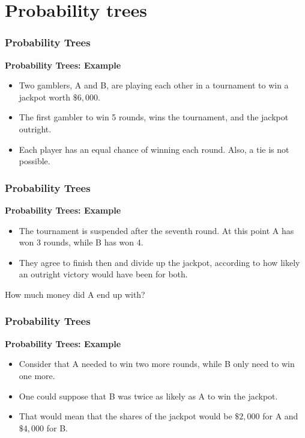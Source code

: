 \chapter{Probability trees}




\subsection{Probability Trees}
{

\textbf{Probability Trees: Example}
\begin{itemize}
\item Two gamblers, A and B, are playing each other in a tournament to win a jackpot worth $\$6,000$. 
\item The first gambler to win 5 rounds, wins the tournament, and the jackpot outright.
\item Each player has an equal chance of winning each round. Also, a tie is not possible.

\end{itemize}

}



\subsection{Probability Trees}
{

\textbf{Probability Trees: Example}
\begin{itemize}
\item The tournament is suspended after the seventh round. At this point A has won 3 rounds, while B has won 4.
\item They agree to finish then and divide up the jackpot, according to how likely an outright victory would have been for both.
\end{itemize}
How much money did A end up with?
}



\subsection{Probability Trees}
{   
\textbf{Probability Trees: Example}
\begin{itemize}
\item Consider that A needed to win two more rounds, while B only need to win one more.
\item One could suppose that B was twice as likely as A to win the jackpot.
\item That would mean that the shares of the jackpot would be $\$2,000$ for A and 
$\$4,000$ for B.
\end{itemize}
}


